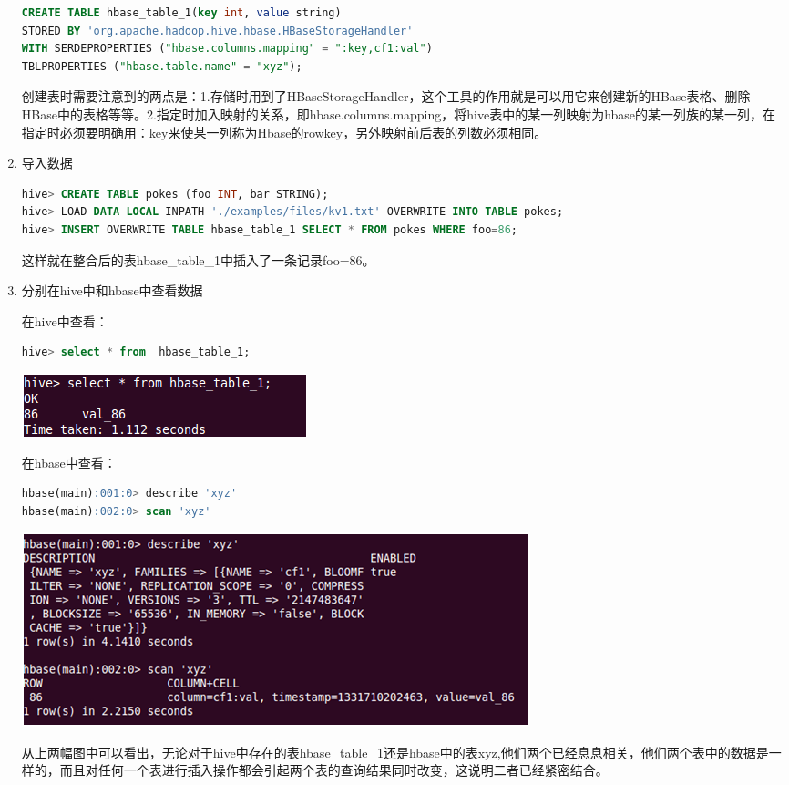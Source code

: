 \begin{enumerate}
\begin{lstlisting}[language=SQL]
CREATE TABLE hbase_table_1(key int, value string)  
STORED BY 'org.apache.hadoop.hive.hbase.HBaseStorageHandler'  
WITH SERDEPROPERTIES ("hbase.columns.mapping" = ":key,cf1:val")  
TBLPROPERTIES ("hbase.table.name" = "xyz");
\end{lstlisting}


创建表时需要注意到的两点是：1.存储时用到了HBaseStorageHandler，这个工具的作用就是可以用它来创建新的HBase表格、删除HBase中的表格等等。2.指定时加入映射的关系，即hbase.columns.mapping，将hive表中的某一列映射为hbase的某一列族的某一列，在指定时必须要明确用：key来使某一列称为Hbase的rowkey，另外映射前后表的列数必须相同。

\item 导入数据

\begin{lstlisting}[language=SQL]
hive> CREATE TABLE pokes (foo INT, bar STRING); 
hive> LOAD DATA LOCAL INPATH './examples/files/kv1.txt' OVERWRITE INTO TABLE pokes;
hive> INSERT OVERWRITE TABLE hbase_table_1 SELECT * FROM pokes WHERE foo=86;
\end{lstlisting}

这样就在整合后的表hbase\_table\_1中插入了一条记录foo=86。

\item 分别在hive中和hbase中查看数据

在hive中查看：
\begin{lstlisting}[language=SQL]
hive> select * from  hbase_table_1;
\end{lstlisting}

\includegraphics[]{photo/integration-hive.png}

在hbase中查看：
\begin{lstlisting}[language=SQL]
hbase(main):001:0> describe 'xyz'   
hbase(main):002:0> scan 'xyz'
\end{lstlisting}

\includegraphics[]{photo/integration-hbase.png}

  从上两幅图中可以看出，无论对于hive中存在的表hbase\_table\_1还是hbase中的表xyz,他们两个已经息息相关，他们两个表中的数据是一样的，而且对任何一个表进行插入操作都会引起两个表的查询结果同时改变，这说明二者已经紧密结合。
\end{enumerate}

